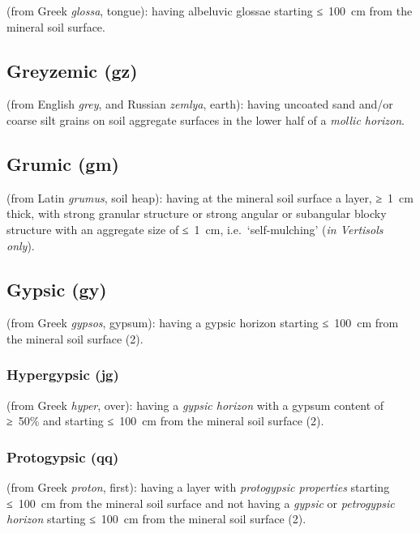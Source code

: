 \documentclass[
  letterpaper,
  DIV=11,
  numbers=noendperiod]{scrreprt}
\begin{document}
(from Greek \emph{glossa}, tongue): having albeluvic glossae starting
≤~100~cm from the mineral soil surface.

\hypertarget{greyzemic-gz}{%
\subsection{Greyzemic (gz)}\label{greyzemic-gz}}

(from English \emph{grey}, and Russian \emph{zemlya}, earth): having
uncoated sand and/or coarse silt grains on soil aggregate surfaces in
the lower half of a \emph{mollic horizon}.

\hypertarget{grumic-gm}{%
\subsection{Grumic (gm)}\label{grumic-gm}}

(from Latin \emph{grumus}, soil heap): having at the mineral soil
surface a layer, ≥~1~cm thick, with strong granular structure or strong
angular or subangular blocky structure with an aggregate size of ≤~1~cm,
i.e.~`self-mulching' (\emph{in Vertisols only}).

\hypertarget{gypsic-gy}{%
\subsection{Gypsic (gy)}\label{gypsic-gy}}

(from Greek \emph{gypsos}, gypsum): having a gypsic horizon starting
≤~100~cm from the mineral soil surface (2).

\hypertarget{hypergypsic-jg}{%
\subsubsection{Hypergypsic (jg)}\label{hypergypsic-jg}}

(from Greek \emph{hyper}, over): having a \emph{gypsic horizon} with a
gypsum content of ≥~50\% and starting ≤~100~cm from the mineral soil
surface (2).

\hypertarget{protogypsic-qq}{%
\subsubsection{Protogypsic (qq)}\label{protogypsic-qq}}

(from Greek \emph{proton}, first): having a layer with \emph{protogypsic
properties} starting ≤~100~cm from the mineral soil surface and not
having a \emph{gypsic} or \emph{petrogypsic horizon} starting ≤~100~cm
from the mineral soil surface (2).
\end{document}
